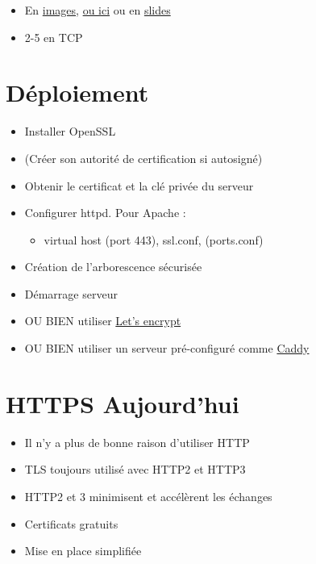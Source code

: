 \begin{itemize}
\tightlist
\item
  En
  \href{https://tiptopsecurity.com/how-does-https-work-rsa-encryption-explained/}{images},
  \href{http://software-engineer-tips-and-tricks.blogspot.ch/2012/08/ssl-in-pictures.html?view=sidebar}{ou
  ici} ou en
  \href{https://www.youtube.com/embed/iQsKdtjwtYI?rel=0}{slides}
\item
  2-5 en TCP
\end{itemize}

\hypertarget{duxe9ploiement}{%
\section{Déploiement}\label{duxe9ploiement}}

\begin{itemize}
\tightlist
\item
  Installer OpenSSL
\item
  (Créer son autorité de certification si autosigné)
\item
  Obtenir le certificat et la clé privée du serveur
\item
  Configurer httpd. Pour Apache :

  \begin{itemize}
  \tightlist
  \item
    virtual host (port 443), ssl.conf, (ports.conf)
  \end{itemize}
\item
  Création de l'arborescence sécurisée
\item
  Démarrage serveur
\item
  OU BIEN utiliser \href{https://letsencrypt.org/}{Let's encrypt}
\item
  OU BIEN utiliser un serveur pré-configuré comme
  \href{https://caddyserver.com/}{Caddy}
\end{itemize}

\hypertarget{https-aujourdhui}{%
\section{HTTPS Aujourd'hui}\label{https-aujourdhui}}

\begin{itemize}
\tightlist
\item
  Il n'y a plus de bonne raison d'utiliser HTTP
\item
  TLS toujours utilisé avec HTTP2 et HTTP3
\item
  HTTP2 et 3 minimisent et accélèrent les échanges
\item
  Certificats gratuits
\item
  Mise en place simplifiée
\end{itemize}

